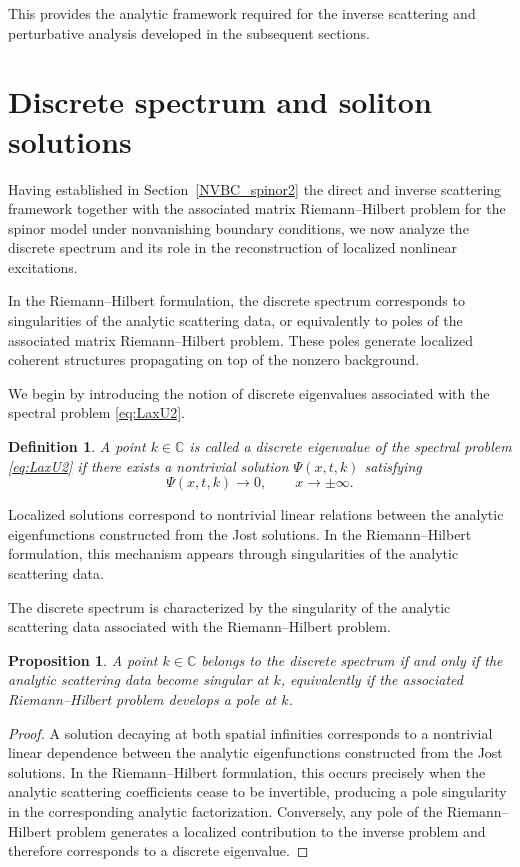 \documentclass[11pt]{amsart}
\newtheorem{proposition}{Proposition}[section]
\newtheorem{definition}{Definition}[section]
\theoremstyle{definition}
\numberwithin{equation}{section}
\begin{document}
This provides the analytic framework required for the inverse scattering and perturbative analysis developed in the subsequent sections.
\section{Discrete spectrum and soliton solutions}
\label{NVBC_spinor3}

Having established in Section~\ref{NVBC_spinor2} the direct and inverse scattering framework together with the associated matrix Riemann--Hilbert problem for the spinor model under nonvanishing boundary conditions, we now analyze the discrete spectrum and its role in the reconstruction of localized nonlinear excitations.

In the Riemann--Hilbert formulation, the discrete spectrum corresponds to singularities of the analytic scattering data, or equivalently to poles of the associated matrix Riemann--Hilbert problem. These poles generate localized coherent structures propagating on top of the nonzero background.

We begin by introducing the notion of discrete eigenvalues associated with the spectral problem \eqref{eq:LaxU2}.

\begin{definition}
A point $k\in\mathbb C$ is called a discrete eigenvalue of the spectral problem \eqref{eq:LaxU2} if there exists a nontrivial solution $\Psi(x,t,k)$ satisfying
\begin{equation}
\Psi(x,t,k)\to 0,
\qquad x\to\pm\infty .
\label{eq:DiscreteDecay}
\end{equation}
\end{definition}

Localized solutions correspond to nontrivial linear relations between the analytic eigenfunctions constructed from the Jost solutions. In the Riemann--Hilbert formulation, this mechanism appears through singularities of the analytic scattering data.

The discrete spectrum is characterized by the singularity of the analytic scattering data associated with the Riemann--Hilbert problem.

\begin{proposition}
A point $k\in\mathbb C$ belongs to the discrete spectrum if and only if the analytic scattering data become singular at $k$, equivalently if the associated Riemann--Hilbert problem develops a pole at $k$.
\end{proposition}

\begin{proof}
A solution decaying at both spatial infinities corresponds to a nontrivial linear dependence between the analytic eigenfunctions constructed from the Jost solutions. In the Riemann--Hilbert formulation, this occurs precisely when the analytic scattering coefficients cease to be invertible, producing a pole singularity in the corresponding analytic factorization. Conversely, any pole of the Riemann--Hilbert problem generates a localized contribution to the inverse problem and therefore corresponds to a discrete eigenvalue.
\end{proof}
\end{document}
